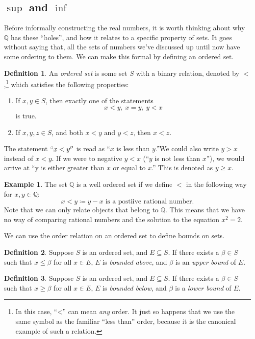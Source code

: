 \documentclass{article}
\newcommand{\Q}{\mathbb{Q}}
\theoremstyle{definition}
\newtheorem{definition}{Definition}[section]
\newtheorem{example}{Example}[section]
\begin{document}
	\subsection{$ \sup $ and $ \inf $}
	Before informally constructing the real numbers, it is worth thinking about why $ \Q $ has these ``holes'', and how it relates to a specific property of sets. It goes without saying that, all the sets of numbers we've discussed up until now have some ordering to them. We can make this formal by defining an ordered set.
	\begin{definition}\label{def1.5}
		An \textit{\color{red}ordered set} is some set $ S $ with a binary relation, denoted by $ < $,\footnote{In this case, ``<'' can mean \textit{any} order. It just so happens that we use the same symbol as the familiar ``less than'' order, because it is the canonical example of such a relation.} which satisfies the following properties:
		\begin{enumerate}
			\item If $ x,y\in S $, then exactly one of the statements $$x<y,\ x=y,\ y<x $$ is true.
			\item If $ x,y,z\in S $, and both $ x<y $ and $ y<z $, then $ x<z $. 
		\end{enumerate}
	\end{definition}  
	The statement $ ``x<y'' $ is read as ``$ x  $ is less than $ y $.''We could also write $ y>x $ instead of $ x<y $. If we were to negative $ y<x $ (``$ y $ is not less than $ x $''), we would arrive at ``y is either greater than $ x $ or equal to $ x $.'' This is denoted as $ y\ge x $. 
	\begin{example}
		The set $ \Q $ is a well ordered set if we define $ < $ in the following way for $ x,y\in\Q $:
		$$ x<y\coloneqq y-x \text{ is a postiive rational number}.   $$ Note that we can only relate objects that belong to $ \Q $. This means that we have no way of comparing rational numbers and the solution to the equation $ x^2=2 $.  
	\end{example}
	We can use the order relation on an ordered set to define bounds on sets.
	\begin{definition}\label{def1.6}
		Suppose $ S $ is an ordered set, and $ E\subseteq S $. If there exists a $ \beta\in S $ such that $ x\le\beta $ for all $ x\in E $, $ E $ is \textit{\color{red}bounded above}, and $ \beta $ is an \textit{\color{red} upper bound} of $ E $. 
	\end{definition}
	\begin{definition}\label{def1.7}
		Suppose $ S $ is an ordered set, and $ E\subseteq S $. If there exists a $ \beta\in S $ such that $ x\ge\beta $ for all $ x\in E $, $ E $ is \textit{\color{red}bounded below}, and $ \beta $ is a \textit{\color{red} lower bound} of $ E $. 
	\end{definition}
\end{document}
